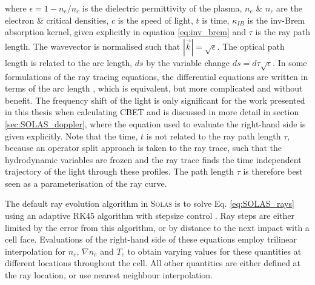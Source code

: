 where $\epsilon=1-n_e/n_c$ is the dielectric permittivity of the plasma, $n_e$ \& $n_c$ are the electron \& critical densities, $c$ is the speed of light, $t$ is time, $\kappa_{IB}$ is the \ac{inv-Brem} absorption kernel, given explicitly in equation \ref{eq:inv_brem} and $\tau$ is the ray path length.
The wavevector is normalised such that $|\vec{k}|=\sqrt{\epsilon}$.
The optical path length is related to the arc length, $ds$ by the variable change $ds=d\tau\sqrt{\epsilon}$.
In some formulations of the ray tracing equations, the differential equations are written in terms of the arc length \cite{marozas_wavelength-detuning_2018,kaiser_laser_2000}, which is equivalent, but more complicated and without benefit.
The frequency shift of the light is only significant for the work presented in this thesis when calculating \ac{CBET} and is discussed in more detail in section \ref{sec:SOLAS_doppler}, where the equation used to evaluate the right-hand side is given explicitly.
Note that the time, $t$ is not related to the ray path length $\tau$, because an operator split approach is taken to the ray trace, such that the hydrodynamic variables are frozen and the ray trace finds the time independent trajectory of the light through these profiles.
The path length $\tau$ is therefore best seen as a parameterisation of the ray curve.

The default ray evolution algorithm in \textsc{Solas} is to solve Eq. \ref{eq:SOLAS_rays} using an adaptive RK45 algorithm with stepsize control \cite{press_numerical_2007}.
Ray steps are either limited by the error from this algorithm, or by distance to the next impact with a cell face.
Evaluations of the right-hand side of these equations employ trilinear interpolation for $n_e$, $\nabla n_e$ and $T_e$ to obtain varying values for these quantities at different locations throughout the cell.
All other quantities are either defined at the ray location, or use nearest neighbour interpolation.

